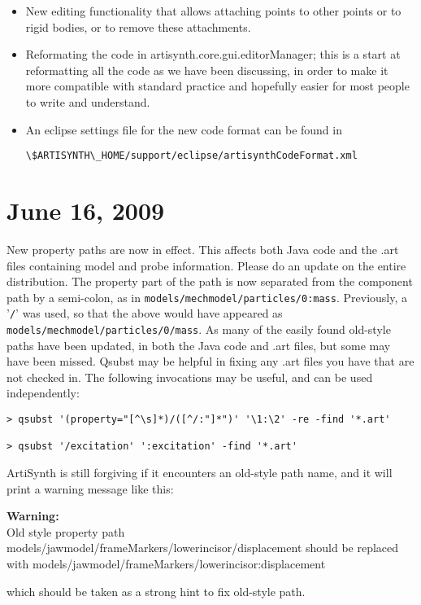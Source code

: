\documentclass{article}
\begin{document}
\begin{itemize}

\item New editing functionality that allows attaching points to other
points or to rigid bodies, or to remove these attachments.

\item Reformating the code in artisynth.core.gui.editorManager; this is a 
start at reformatting all the code as we have been discussing, in
order to make it more compatible with standard practice and hopefully 
easier for most people to write and understand.

\item An eclipse settings file for the new code format can be found in
\begin{verbatim}
\$ARTISYNTH\_HOME/support/eclipse/artisynthCodeFormat.xml
\end{verbatim}

\end{itemize}

\section*{June 16, 2009}

New property paths are now in effect. This affects both Java code and 
the .art files containing model and probe information. Please do an 
update on the entire distribution. The property part of the path is
now separated from the component path by a semi-colon, as in 
{\tt models/mechmodel/particles/0:mass}. Previously, a '{\tt /}' was used, 
so that the above would have appeared as 
{\tt models/mechmodel/particles/0/mass}. As many of the easily found
old-style paths have been updated, in both the Java code and .art
files, but some may have been missed. Qsubst may be helpful in fixing 
any .art files you have that are not checked in. The following 
invocations may be useful, and can be used independently:

\begin{lstlisting}
> qsubst '(property="[^\s]*)/([^/:"]*")' '\1:\2' -re -find '*.art'

> qsubst '/excitation' ':excitation' -find '*.art'
\end{lstlisting}

ArtiSynth is still forgiving if it encounters an old-style path name, 
and it will print a warning message like this: 
\begin{sideblock}
{\bf Warning:}\\
Old style 
property path models/jawmodel/frameMarkers/lowerincisor/displacement 
should be replaced with 
models/jawmodel/frameMarkers/lowerincisor:displacement
\end{sideblock}
which should 
be taken as a strong hint to fix old-style path.
\end{document}
